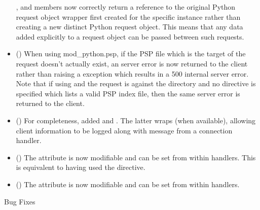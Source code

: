 \begin{itemize}
      ,  and  members now
      correctly return a reference to the original Python request object
      wrapper first created for the specific  instance
      rather than creating a new distinct Python request object. This means
      that any data added explicitly to a request object can be passed
      between such requests.
    \item
      ()
      When using mod_python.psp, if the PSP file which is the target of the
      request doesn't actually exist, an  server
      error is now returned to the client rather than raising a
       exception which results in a 500 internal server error.
      Note that if using  and the request is against the
      directory and no  directive is specified which
      lists a valid PSP index file, then the same 
      server error is returned to the client.
    \item
      ()
      For completeness, added  and
      . The latter wraps
       (when available), allowing client information
      to be logged along with message from a connection handler.
    \item
      ()
      The attribute  is now modifiable and can
      be set from within handlers. This is equivalent to having used the
       directive.
    \item
      ()
      The attribute  is now modifiable and can be set from
      within handlers.
  \end{itemize}

  Bug Fixes


